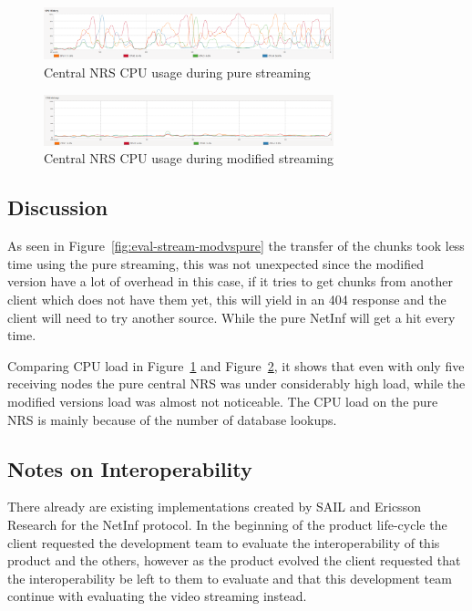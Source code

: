 \begin{figure}[h!]
	\centering
		\includegraphics[width=0.75\textwidth]{./img/eval-stream-pure-cpu.png}
    	\caption{Central NRS CPU usage during pure streaming}
	\label{fig:eval-stream-pure-cpu}
\end{figure}

\begin{figure}[h!]
	\centering
		\includegraphics[width=0.75\textwidth]{./img/eval-stream-mod-cpu.png}
    	\caption{Central NRS CPU usage during modified streaming}
	\label{fig:eval-stream-mod-cpu}
\end{figure}

\subsection{Discussion}
As seen in Figure~\ref{fig:eval-stream-modvspure} the transfer of the chunks took less time using the pure streaming, this was not unexpected since the modified version have a lot of overhead in this case, if it tries to get chunks from another client which does not have them yet, this will yield in an 404 response and the client will need to try another source. While the pure NetInf will get a hit every time. 

Comparing CPU load in Figure~\ref{fig:eval-stream-pure-cpu} and Figure~\ref{fig:eval-stream-mod-cpu}, it shows that even with only five receiving nodes the pure central NRS was under considerably high load, while the modified versions load was almost not noticeable. The CPU load on the pure NRS is mainly because of the number of database lookups. 

\subsection{Notes on Interoperability}

There already are existing implementations created by SAIL and Ericsson Research for the NetInf protocol. In the beginning of the product life-cycle the client requested the development team to evaluate the interoperability of this product and the others, however as the product evolved the client requested that the interoperability be left to them to evaluate and that this development team continue with evaluating the video streaming instead.

